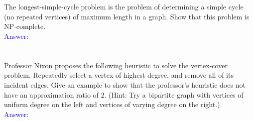 \documentclass[a4paper]{article}
\begin{document}
\section{} The longest-simple-cycle problem is the problem of determining a simple cycle (no repeated vertices) of maximum length in a graph. Show that this problem is NP-complete.\\
\textcolor{blue}{Answer:}

\section{} Professor Nixon proposes the following heuristic to solve the vertex-cover problem. Repeatedly select a vertex of highest degree, and remove all of its incident edges. Give an example to show that the professor's heuristic does not have an approximation ratio of $2$.
(Hint: Try a bipartite graph with vertices of uniform degree on the left and vertices of varying degree on the right.)\\
\textcolor{blue}{Answer:}
\end{document}
